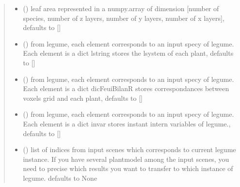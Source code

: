\documentclass[letterpaper,10pt,english]{sphinxmanual}
\begin{document}
\begin{fulllineitems}
\begin{fulllineitems}
\begin{quote}
\begin{description}
\begin{itemize}
\item {} 
\sphinxAtStartPar
{} (\sphinxstyleliteralemphasis{\sphinxupquote{, }}) \textendash{} leaf area represented in a numpy.array of dimension {[}number of species, number of z layers, number of y layers, number of x layers{]}, defaults to {[}{]}

\item {} 
\sphinxAtStartPar
{} (\sphinxstyleliteralemphasis{\sphinxupquote{, }}) \textendash{} from l\sphinxhyphen{}egume, each element corresponds to an input specy of l\sphinxhyphen{}egume. Each element is a dict lstring stores the l\sphinxhyphen{}system of each plant, defaults to {[}{]}

\item {} 
\sphinxAtStartPar
{} (\sphinxstyleliteralemphasis{\sphinxupquote{, }}) \textendash{} from l\sphinxhyphen{}egume, each element corresponds to an input specy of l\sphinxhyphen{}egume. Each element is a dict dicFeuiBilanR stores correspondances between voxels grid and each plant, defaults to {[}{]}

\item {} 
\sphinxAtStartPar
{} (\sphinxstyleliteralemphasis{\sphinxupquote{, }}) \textendash{} from l\sphinxhyphen{}egume, each element corresponds to an input specy of l\sphinxhyphen{}egume. Each element is a dict invar stores instant intern variables of l\sphinxhyphen{}egume., defaults to {[}{]}

\item {} 
\sphinxAtStartPar
{} (\sphinxstyleliteralemphasis{\sphinxupquote{, }}) \textendash{} list of indices from input scenes which corresponds to current l\sphinxhyphen{}egume instance. If you have several plantmodel among the input scenes, you need to precise which results you want to transfer to which instance of l\sphinxhyphen{}egume. defaults to None


\end{itemize}
\end{description}
\end{quote}
\end{fulllineitems}
\end{fulllineitems}
\end{document}
